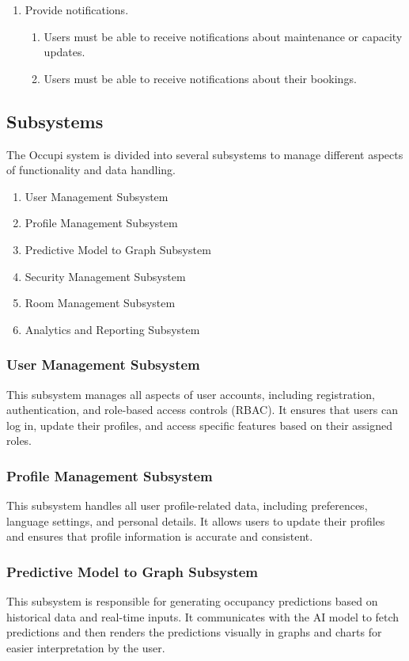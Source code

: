 \documentclass[11pt,a4paper]{article}
\begin{document}
\begin{enumerate}[label=\arabic*.]
    \item Provide notifications.
    \begin{enumerate}
        \item Users must be able to receive notifications about maintenance or capacity updates.
        \item Users must be able to receive notifications about their bookings.
    \end{enumerate}
\end{enumerate}

\subsection*{Subsystems}
The Occupi system is divided into several subsystems to manage different aspects of functionality and data handling.

\begin{enumerate}
    \item User Management Subsystem
    \item Profile Management Subsystem
    \item Predictive Model to Graph Subsystem
    \item Security Management Subsystem
    \item Room Management Subsystem
    \item Analytics and Reporting Subsystem
\end{enumerate}

\subsubsection*{User Management Subsystem}
This subsystem manages all aspects of user accounts, including registration, authentication, and role-based access controls (RBAC). It ensures that users can log in, update their profiles, and access specific features based on their assigned roles.

\subsubsection*{Profile Management Subsystem}
This subsystem handles all user profile-related data, including preferences, language settings, and personal details. It allows users to update their profiles and ensures that profile information is accurate and consistent.

\subsubsection*{Predictive Model to Graph Subsystem}
This subsystem is responsible for generating occupancy predictions based on historical data and real-time inputs. It communicates with the AI model to fetch predictions and then renders the predictions visually in graphs and charts for easier interpretation by the user.
\end{document}
